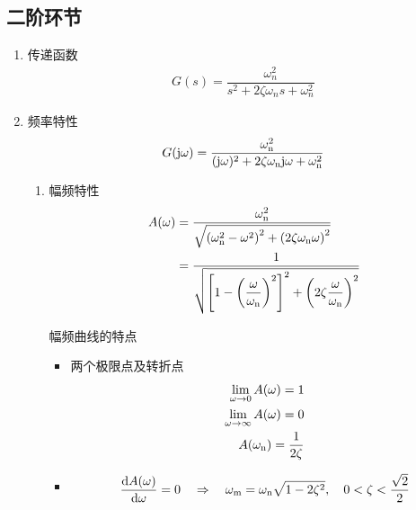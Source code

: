 \subsection{二阶环节}
\begin{enumerate}[1.]
	\item 传递函数
	\vspace*{-0.5em}
	\begin{align}
		G(s) = \dfrac{\omega_n^2}{s^2 + 2 \zeta \omega_ns + \omega_n^2}
	\end{align}
	\vspace*{-3em}
	
	\item 频率特性
	\vspace*{-0.5em}
	\begin{align}
		G(\text{j}  \omega) = \dfrac{\omega_{\rm{n}}^2}{(\text{j} \omega)^2 + 2 \zeta \omega_{\rm{n}} \text{j} \omega + \omega_{\rm{n}}^2}
	\end{align}
	\vspace*{-3em}
	\begin{enumerate}[(1) ]
		\item 幅频特性
		\vspace*{-0.5em}
		\begin{equation}
			\begin{split}
				A(\omega) &= \dfrac{\omega_{\rm{n}}^2}{\sqrt{\left(\omega_{\rm{n}}^2 - \omega^2\right)^2 + \left(2 \zeta \omega_{\rm{n}} \omega\right)^2}}\\
				& =  \dfrac{1}{\sqrt{\left[1 - \left(\dfrac{\omega}{\omega_{\rm{n}}}\right)^2\right]^2 + \left(2 \zeta \dfrac{\omega}{\omega_{\rm{n}}}\right)^2}}
			\end{split}
		\end{equation}

		幅频曲线的特点
		\begin{itemize}
			\item 两个极限点及转折点
			\begin{align*}
				\lim\limits_{\omega \to 0} A(\omega) = 1\\
				\lim\limits_{\omega \to \infty} A(\omega) = 0\\
				A(\omega_{\rm{n}}) = \dfrac{1}{2 \zeta}
			\end{align*}
		
			\item {}
			\begin{align}
				\dfrac{{\rm{d}} A(\omega)}{{\rm{d}} \omega} = 0 \quad \Rightarrow \quad \omega_\text{m} = \omega_{\rm{n}} \sqrt{1 - 2 \zeta^2}, \quad 0< \zeta < \dfrac{\sqrt{2}}{2}
				\label{谐振频率}
			\end{align}
		

\end{itemize}
\end{enumerate}
\end{enumerate}
